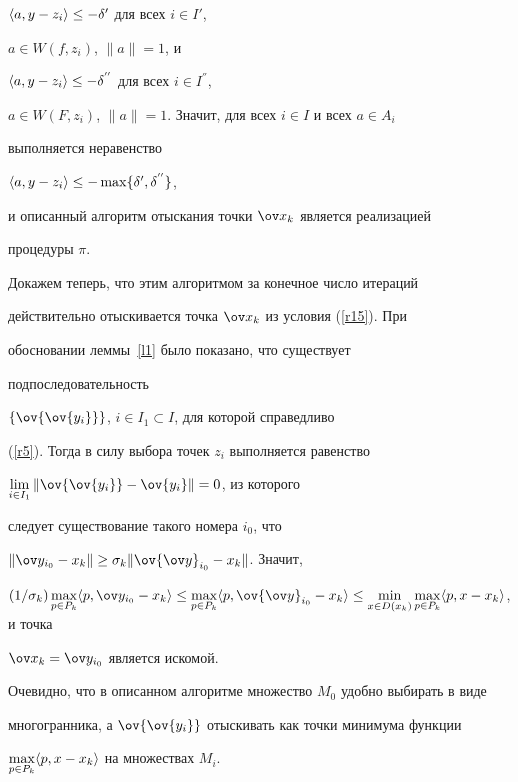 $\langle a, y-z_i \rangle \le -\delta'$ для всех $i\in I'$,


$a\in W(f,z_i)$, $\|a\|=1$, и


$\langle a, y-z_i \rangle \le -\delta^{''}$ для всех $i\in I^{''}$,


$a\in W(F,z_i)$, $\|a\|=1$. Значит, для всех $i\in I$ и всех $a\in A_i$


выполняется неравенство


$\langle a, y-z_i \rangle \le -\max \{\delta', \delta^{''}\}$,


и описанный алгоритм отыскания точки $\ov x_k$ является реализацией


процедуры $\pi$.





Докажем теперь, что этим алгоритмом за конечное число итераций


действительно отыскивается точка $\ov x_k$ из условия (\ref{r15}). При


обосновании леммы~\ref{l1} было показано, что существует


подпоследовательность


$\{\ov{\ov{y_i}}\}$, $i\in I_1\subset I$, для которой справедливо


(\ref{r5}). Тогда в силу выбора точек $z_i$ выполняется равенство


$\lim \limits_{i\in I_1} \|\ov{\ov{y_i}}-\ov{y_i}\|=0$, из которого


следует существование такого номера $i_0$, что


$\|\ov y_{i_0}-x_k\|\ge \sigma_k \|\ov{\ov y}_{i_0}-x_k\|$. Значит,


$(1/\sigma_k)\max \limits_{p\in P_k} \la p, \ov y_{i_0}-x_k \ra 


\le


\max \limits_{p\in P_k} \la p,\ov{\ov y}_{i_0} - x_k \ra \le


\min \limits_{x\in D(x_k)}


\max \limits_{p\in P_k} \la p, x-x_k \ra $, и точка


$\ov x_k= \ov y_{i_0}$ является искомой.





Очевидно, что в описанном алгоритме множество $M_0$ удобно выбирать в виде


многогранника, а $\ov{\ov{y_i}}$ отыскивать как точки минимума функции


$\max \limits_{p\in P_k} \langle p, x-x_k \rangle $ на множествах $M_i$.





